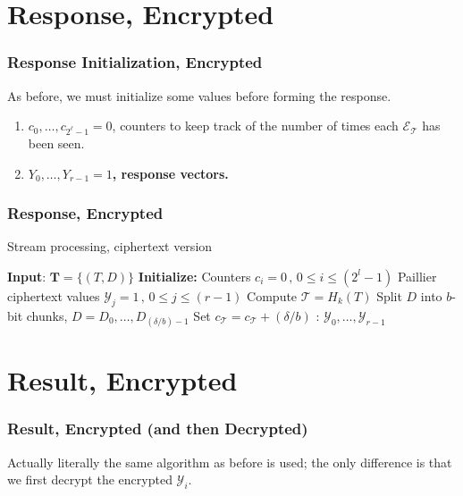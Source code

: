 \documentclass{beamer}
\makeatletter
\DeclareRobustCommand*{\&}{%
  \nfss@text{%
    \fontfamily{LinuxBiolinumT-TLF}%
    \selectfont
    \symbol{`\&}%
  }%
}
\makeatother
\begin{document}
\section{Response, Encrypted}
\begin{frame}
  \frametitle{Response Initialization, Encrypted}
  As before, we must initialize some values before forming the response.
  \begin{enumerate}
    \item $c_0,\ldots,c_{2^\ell - 1} = 0$, counters to keep track of the number
      of times each {\boldmath $\mathcal{E}_\mathcal{T}$} has been seen.
    \item {\bfseries\boldmath $Y_0,\ldots,Y_{r-1} = 1$, response vectors.}
  \end{enumerate}
\end{frame}

\begin{frame}
  \frametitle{Response, Encrypted}
  \begin{algorithm}[H]
  \caption{Stream processing, ciphertext version}\label{alg.cipher_processing}
\begin{algorithmic}[1]
\State \textbf{Input}:  $\mathbf{T} = \{ (T,D) \}$
\State \textbf{Initialize:}
\State \qquad Counters $c_i = 0 \, , \, 0 \leq i \leq (2^l -1)$
\State \qquad Paillier ciphertext values  $\mathcal{Y}_{j} = 1 \, , \, 0 \leq j \leq (r-1)$
  \State Compute \(\mathcal{T} = H_{k}(T)\)
  \State \Return
  \Else
  \State Split \(D\) into \(b\)-bit chunks,
  \(D=D_{0},\ldots,D_{(\delta/b)-1}\) \label{step.datachunk}
  \EndFor
  \State Set \(c_{\mathcal{T}} = c_{\mathcal{T}}+(\delta/b)\)
  \EndIf
\EndFor
{}: \(\mathcal{Y}_{0},\ldots,\mathcal{Y}_{r-1}\)
\end{algorithmic}
\end{algorithm}
\end{frame}

\section{Result, Encrypted}
\begin{frame}
  \frametitle{Result, Encrypted (and then Decrypted)}
  Actually literally the same algorithm as before is used; the only difference
  is that we first decrypt the encrypted $\mathcal{Y}_i$.
\end{frame}
\end{document}
